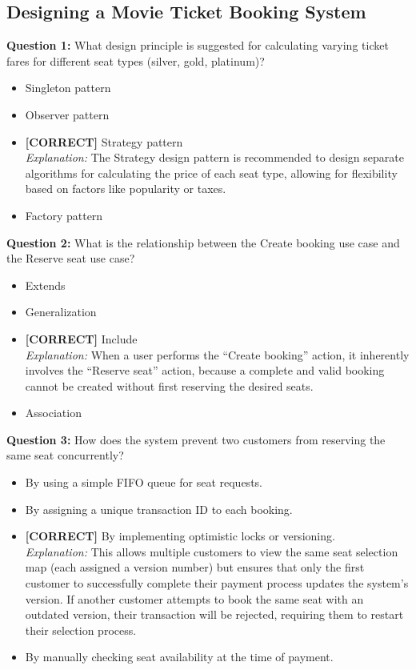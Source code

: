 \subsection*{Designing a Movie Ticket Booking System}
\vspace{0.3cm}
\noindent
\textbf{Question 1:} What design principle is suggested for calculating varying ticket fares for different seat types (silver, gold, platinum)?
\\[0.2cm]
\begin{itemize}
 \item Singleton pattern
 \item Observer pattern
 \item \textbf{[CORRECT]} Strategy pattern
\\[0.1cm]
\textit{Explanation:} 
The Strategy design pattern is recommended to design separate algorithms for calculating the price of each seat type, allowing for flexibility based on factors like popularity or taxes.
 \item Factory pattern
\end{itemize}
\vspace{0.3cm}
\noindent
\textbf{Question 2:} What is the relationship between the Create booking use case and the Reserve seat use case?
\\[0.2cm]
\begin{itemize}
 \item Extends
 \item Generalization
 \item \textbf{[CORRECT]} Include
\\[0.1cm]
\textit{Explanation:} 
When a user performs the ``Create booking'' action, it inherently involves the ``Reserve seat'' action, because a complete and valid booking cannot be created without first reserving the desired seats.
 \item Association
\end{itemize}
\vspace{0.3cm}
\noindent
\textbf{Question 3:} How does the system prevent two customers from reserving the same seat concurrently?
\\[0.2cm]
\begin{itemize}
 \item By using a simple FIFO queue for seat requests.
 \item By assigning a unique transaction ID to each booking.
 \item \textbf{[CORRECT]} By implementing optimistic locks or versioning.
\\[0.1cm]
\textit{Explanation:} 
This allows multiple customers to view the same seat selection map (each assigned a version number) but ensures that only the first customer to successfully complete their payment process updates the system's version. If another customer attempts to book the same seat with an outdated version, their transaction will be rejected, requiring them to restart their selection process.
 \item By manually checking seat availability at the time of payment.
\end{itemize}

